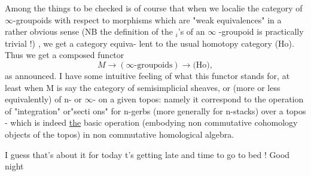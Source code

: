 Among the things to be checked is of course that when we localie
the category of \deleted{(}$\infty$-groupoids with respect to morphisms which are "weak
equivalences" in a rather obvious sense (NB the definition of the \hand{$\pi$}$_i$'s
of an $\infty$ -groupoid is practically trivial !) , we get a category equiva-%
lent to the usual homotopy category (Ho). Thus we get a composed functor
\[ M \longrightarrow (\infty\text{-groupoids}) \longrightarrow \text{(Ho)} , \]
as announced. I have some intuitive feeling of what this functor stands
for, at least when M is say the category of semisimplicial sheaves, or
(more or less equivalently) of n- or $\infty$- on a given
topos: namely it  correspond to the operation of "integration" or"secti\hand{-}
ons" for n-gerbs (more generally for n-stacks) over a topos - which is
indeed \uline{the} basic operation (embodying non commutative cohomology objects
of the topos) in non commutative homological algebra.

I guess that's about it for today\hand{,} t's getting late and time to go
to bed ! Good night \hand{!}

